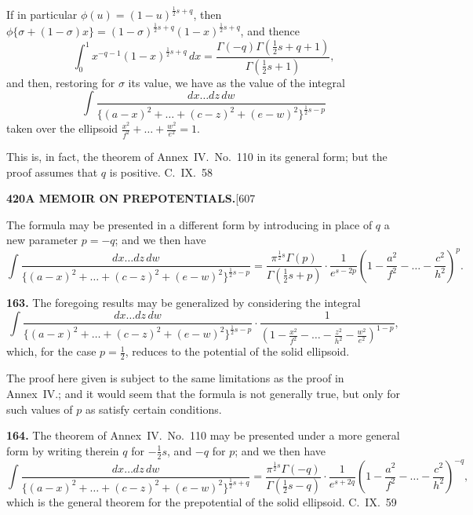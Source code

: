 \documentclass[11pt,a4paper]{book}
\begin{document}
{If in particular $\phi(u) = (1-u)^{\frac{1}{2}s+q}$, then $\phi\{\sigma + (1-\sigma)x\} = (1-\sigma)^{\frac{1}{2}s+q}(1-x)^{\frac{1}{2}s+q}$, and thence
\[
\int_0^1 x^{-q-1}(1-x)^{\frac{1}{2}s+q}\, dx = \frac{\Gamma(-q)\Gamma(\frac{1}{2}s+q+1)}{\Gamma(\frac{1}{2}s+1)},
\]
and then, restoring for $\sigma$ its value, we have as the value of the integral
\[
\int \frac{dx\ldots dz\, dw}{\{(a-x)^2 + \ldots + (c-z)^2 + (e-w)^2\}^{\frac{1}{2}s-p}}
\]
taken over the ellipsoid $\frac{x^2}{f^2} + \ldots + \frac{w^2}{e^2} = 1$.

This is, in fact, the theorem of Annex~IV.\ No.~110 in its general form; but the proof assumes that $q$ is positive.
\hfill C.~IX.\ 58

\newpage
\noindent\textbf{420}\hspace{\fill}\textbf{A MEMOIR ON PREPOTENTIALS.}\hspace{\fill}[607

The formula may be presented in a different form by introducing in place of $q$ a new parameter $p = -q$; and we then have
\[
\int \frac{dx\ldots dz\, dw}{\{(a-x)^2 + \ldots + (c-z)^2 + (e-w)^2\}^{\frac{1}{2}s-p}} = \frac{\pi^{\frac{1}{2}s}\Gamma(p)}{\Gamma(\frac{1}{2}s+p)} \cdot \frac{1}{e^{s-2p}} \left(1 - \frac{a^2}{f^2} - \ldots - \frac{c^2}{h^2}\right)^{p}.
\]

\medskip
\noindent\textbf{163.}
The foregoing results may be generalized by considering the integral
\[
\int \frac{dx\ldots dz\, dw}{\{(a-x)^2 + \ldots + (c-z)^2 + (e-w)^2\}^{\frac{1}{2}s-p}} \cdot \frac{1}{(1 - \frac{x^2}{f^2} - \ldots - \frac{z^2}{h^2} - \frac{w^2}{e^2})^{1-p}},
\]
which, for the case $p = \frac{1}{2}$, reduces to the potential of the solid ellipsoid.

The proof here given is subject to the same limitations as the proof in Annex~IV.; and it would seem that the formula is not generally true, but only for such values of $p$ as satisfy certain conditions.

\medskip
\noindent\textbf{164.}
The theorem of Annex~IV.\ No.~110 may be presented under a more general form by writing therein $q$ for $-\frac{1}{2}s$, and $-q$ for $p$; and we then have
\[
\int \frac{dx\ldots dz\, dw}{\{(a-x)^2 + \ldots + (c-z)^2 + (e-w)^2\}^{\frac{1}{2}s+q}} = \frac{\pi^{\frac{1}{2}s}\Gamma(-q)}{\Gamma(\frac{1}{2}s-q)} \cdot \frac{1}{e^{s+2q}} \left(1 - \frac{a^2}{f^2} - \ldots - \frac{c^2}{h^2}\right)^{-q},
\]
which is the general theorem for the prepotential of the solid ellipsoid.
\hfill C.~IX.\ 59

}
\end{document}
